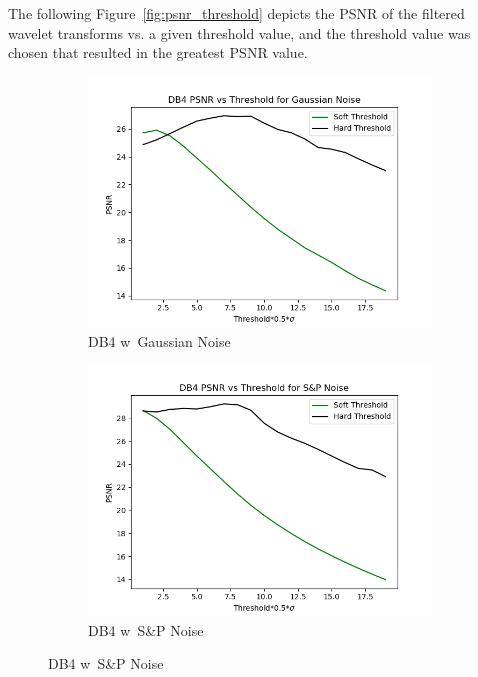 \documentclass{article}\raggedbottom
\begin{document}
The following Figure~\ref{fig:psnr_threshold} depicts the PSNR of the filtered wavelet transforms vs. a given threshold value, and the threshold value was chosen that resulted in the greatest PSNR value.

\begin{figure}[H]
	\centering
	\begin{subfigure}[b]{0.45\linewidth}
		\includegraphics[width=\linewidth]{../../1_Resources/images/DB4_threshold_g.png}
		\caption{DB4 w\ Gaussian Noise}
	\end{subfigure}
	\begin{subfigure}[b]{0.45\linewidth}
		\includegraphics[width=\linewidth]{../../1_Resources/images/DB4_threshold_sp.png}
		\caption{DB4 w\ S\&P Noise}
	\end{subfigure}

\end{figure}
\end{document}
